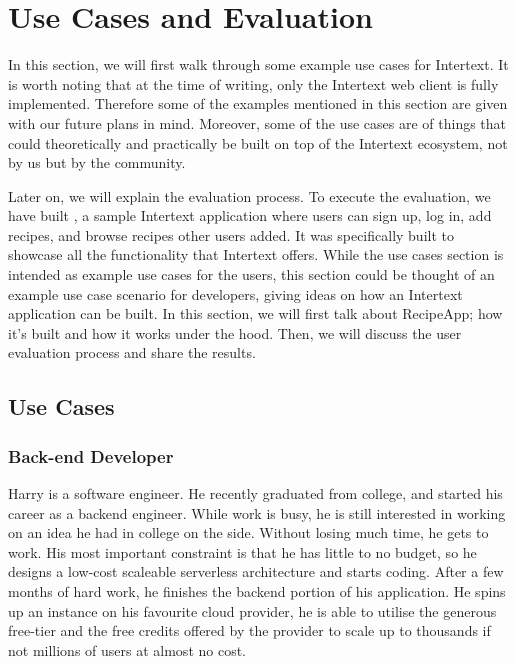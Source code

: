 
\chapter{Use Cases and Evaluation} \label{evaluation}


In this section, we will first walk through some example use cases for Intertext. It is worth noting that at the time of writing, only the Intertext web client is fully implemented. Therefore some of the examples mentioned in this section are given with our future plans in mind. Moreover, some of the use cases are of things that could theoretically and practically be built on top of the Intertext ecosystem, not by us but by the community. 

Later on, we will explain the evaluation process. To execute the evaluation, we have built , a sample Intertext application where users can sign up, log in, add recipes, and browse recipes other users added. It was specifically built to showcase all the functionality that Intertext offers. While the use cases section is intended as example use cases for the users, this section could be thought of an example use case scenario for developers, giving ideas on how an Intertext application can be built. In this section, we will first talk about RecipeApp; how it's built and how it works under the hood. Then, we will discuss the user evaluation process and share the results.

\section{Use Cases}

\subsection{Back-end Developer}

Harry is a software engineer. He recently graduated from college, and started his career as a backend engineer. While work is busy, he is still interested in working on an idea he had in college on the side. Without losing much time, he gets to work. His most important constraint is that he has little to no budget, so he designs a low-cost scaleable serverless architecture and starts coding. After a few months of hard work, he finishes the backend portion of his application. He spins up an instance on his favourite cloud provider, he is able to utilise the generous free-tier and the free credits offered by the provider to scale up to thousands if not millions of users at almost no cost. 

